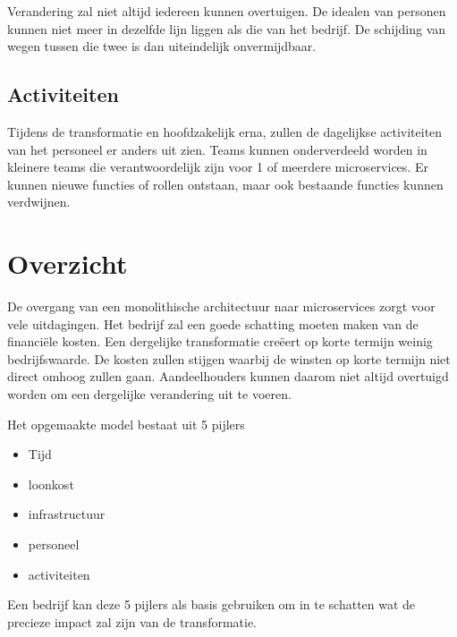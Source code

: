 Verandering zal niet altijd iedereen kunnen overtuigen. De idealen van personen kunnen niet meer in dezelfde lijn liggen als die van het bedrijf. De schijding van wegen tussen die twee is dan uiteindelijk onvermijdbaar.

\subsection{Activiteiten}

Tijdens de transformatie en hoofdzakelijk erna, zullen de dagelijkse activiteiten van het personeel er anders uit zien. Teams kunnen onderverdeeld worden in kleinere teams die verantwoordelijk zijn voor 1 of meerdere microservices. Er kunnen nieuwe functies of rollen ontstaan, maar ook bestaande functies kunnen verdwijnen.  

\section{Overzicht}

De overgang van een monolithische architectuur naar microservices zorgt voor vele uitdagingen. Het bedrijf zal een goede schatting moeten maken van de financiële kosten. Een dergelijke transformatie creëert op korte termijn weinig bedrijfswaarde. De kosten zullen stijgen waarbij de winsten op korte termijn niet direct omhoog zullen gaan. Aandeelhouders kunnen daarom niet altijd overtuigd worden om een dergelijke verandering uit te voeren.

Het opgemaakte model bestaat uit 5 pijlers
\begin{itemize}
    \item Tijd
    \item loonkost
    \item infrastructuur
    \item personeel
    \item activiteiten
\end{itemize}

Een bedrijf kan deze 5 pijlers als basis gebruiken om in te schatten wat de precieze impact zal zijn van de transformatie.

